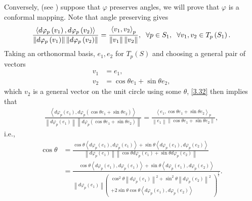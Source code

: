 \documentclass[a4paper]{article}
\numberwithin{equation}{section}
\begin{document}
Conversely, (see \cite{3}) suppose that $\varphi$ preserves angles, we will prove that $\varphi$ is a conformal mapping. Note that angle preserving gives
\begin{align}
\label{3.32}
\frac{{\left\langle {d{\varphi _p}\left( {{v_1}} \right),d{\varphi _p}\left( {{v_2}} \right)} \right\rangle }}{{\left\| {d{\varphi _p}\left( {{v_1}} \right)} \right\|\left\| {d{\varphi _p}\left( {{v_2}} \right)} \right\|}} = \frac{{{{\left\langle {{v_1},{v_2}} \right\rangle }_p}}}{{\left\| {{v_1}} \right\|\left\| {{v_2}} \right\|}},\hspace{0.2cm} \forall p \in {S_1},\hspace{0.2cm}\forall {v_1},{v_2} \in {T_p}\left( {{S_1}} \right).
\end{align}
Taking an orthonormal basis, $e_1,e_2$ for $T_p\left(S\right)$ and choosing a general pair of vectors
\begin{align}
{v_1} &= {e_1},\\
{v_2} &= \cos \theta {e_1} + \sin \theta {e_2},
\end{align}
which $v_2$ is a general vector on the unit circle using some $\theta$, \eqref{3.32} then implies that
\begin{align}
\frac{{\left\langle {d{\varphi _p}\left( {{e_1}} \right),d{\varphi _p}\left( {\cos \theta {e_1} + \sin \theta {e_2}} \right)} \right\rangle }}{{\left\| {d{\varphi _p}\left( {{e_1}} \right)} \right\|\left\| {d{\varphi _p}\left( {\cos \theta {e_1} + \sin \theta {e_2}} \right)} \right\|}} = \frac{{{{\left\langle {{e_1},\cos \theta {e_1} + \sin \theta {e_2}} \right\rangle }_p}}}{{\left\| {{e_1}} \right\|\left\| {\cos \theta {e_1} + \sin \theta {e_2}} \right\|}},
\end{align}
i.e., 
\begin{align}
\label{3.36}
\cos \theta  &= \frac{{\cos \theta \left\langle {d{\varphi _p}\left( {{e_1}} \right),d{\varphi _p}\left( {{e_1}} \right)} \right\rangle  + \sin \theta \left\langle {d{\varphi _p}\left( {{e_1}} \right),d{\varphi _p}\left( {{e_2}} \right)} \right\rangle }}{{\left\| {d{\varphi _p}\left( {{e_1}} \right)} \right\|\left\| {\cos \theta d{\varphi _p}\left( {{e_1}} \right) + \sin \theta d{\varphi _p}\left( {{e_2}} \right)} \right\|}}\\
 &= \frac{{\cos \theta \left\langle {d{\varphi _p}\left( {{e_1}} \right),d{\varphi _p}\left( {{e_1}} \right)} \right\rangle  + \sin \theta \left\langle {d{\varphi _p}\left( {{e_1}} \right),d{\varphi _p}\left( {{e_2}} \right)} \right\rangle }}{{\left\| {d{\varphi _p}\left( {{e_1}} \right)} \right\|{{\left( \begin{array}{l}
{\cos ^2}\theta {\left\| {d{\varphi _p}\left( {{e_1}} \right)} \right\|^2} + {\sin ^2}\theta {\left\| {d{\varphi _p}\left( {{e_2}} \right)} \right\|^2}\\
 + 2\sin \theta \cos \theta \left\langle {d{\varphi _p}\left( {{e_1}} \right),d{\varphi _p}\left( {{e_2}} \right)} \right\rangle 
\end{array} \right)}^{\frac{1}{2}}}}}. \label{3.37}
\end{align}
\end{document}
